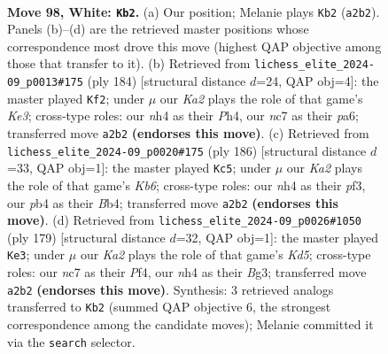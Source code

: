 \documentclass[11pt]{article}
\begin{document}
\clearpage

\begin{figure}[p]\centering
\begin{subfigure}{0.46\textwidth}\centering
\resizebox{\linewidth}{!}{%
\newchessgame
\chessboard[
  setfen={8/1Nn5/7k/8/Pp2P2n/1B2p3/K2b3p/8 w - - 4 98},
  showmover=false,
  pgfstyle=straightmove, color=movearrow, markmove={a2-b2}
]}
\caption{}
\end{subfigure}\hfill
\begin{subfigure}{0.46\textwidth}\centering
\resizebox{\linewidth}{!}{%
\newchessgame
\chessboard[
  setfen={8/8/p2k4/P6p/6bP/4Kp2/3B4/8 w - - 84 93},
  showmover=false,
  pgfstyle=straightmove, color=movearrow, markmove={e3-f2}
]}
\caption{}
\end{subfigure}
\\[4pt]
\begin{subfigure}{0.46\textwidth}\centering
\resizebox{\linewidth}{!}{%
\newchessgame
\chessboard[
  setfen={8/3k4/PK4p1/7p/1BP1b2P/5p2/5P2/8 w - - 57 94},
  showmover=false,
  pgfstyle=straightmove, color=movearrow, markmove={b6-c5}
]}
\caption{}
\end{subfigure}\hfill
\begin{subfigure}{0.46\textwidth}\centering
\resizebox{\linewidth}{!}{%
\newchessgame
\chessboard[
  setfen={8/8/4K3/p7/3k1p2/1B3Pb1/P5P1/8 b - - 67 90},
  showmover=false,
  pgfstyle=straightmove, color=movearrow, markmove={d4-e3}
]}
\caption{}
\end{subfigure}
\caption{\textbf{Move 98, White: \texttt{Kb2}.} (a) Our position; Melanie plays \texttt{Kb2} (\texttt{a2b2}). Panels (b)--(d) are the retrieved master positions whose correspondence most drove this move (highest QAP objective among those that transfer to it). (b) Retrieved from \texttt{lichess\_elite\_2024-09\_p0013\#175} (ply 184) [structural distance $d$=24, QAP obj=4]: the master played \texttt{Kf2}; under $\mu$ our \emph{Ka2} plays the role of that game's \emph{Ke3}; cross-type roles: our \emph{n}h4 as their \emph{P}h4, our \emph{n}c7 as their \emph{p}a6; transferred move \texttt{a2b2} \textbf{(endorses this move)}. (c) Retrieved from \texttt{lichess\_elite\_2024-09\_p0020\#175} (ply 186) [structural distance $d$=33, QAP obj=1]: the master played \texttt{Kc5}; under $\mu$ our \emph{Ka2} plays the role of that game's \emph{Kb6}; cross-type roles: our \emph{n}h4 as their \emph{p}f3, our \emph{p}b4 as their \emph{B}b4; transferred move \texttt{a2b2} \textbf{(endorses this move)}. (d) Retrieved from \texttt{lichess\_elite\_2024-09\_p0026\#1050} (ply 179) [structural distance $d$=32, QAP obj=1]: the master played \texttt{Ke3}; under $\mu$ our \emph{Ka2} plays the role of that game's \emph{Kd5}; cross-type roles: our \emph{n}c7 as their \emph{P}f4, our \emph{n}h4 as their \emph{B}g3; transferred move \texttt{a2b2} \textbf{(endorses this move)}. Synthesis: 3 retrieved analogs transferred to \texttt{Kb2} (summed QAP objective 6, the strongest correspondence among the candidate moves); Melanie committed it via the \texttt{search} selector.}
\label{fig:thought-m194}
\end{figure}
\end{document}
